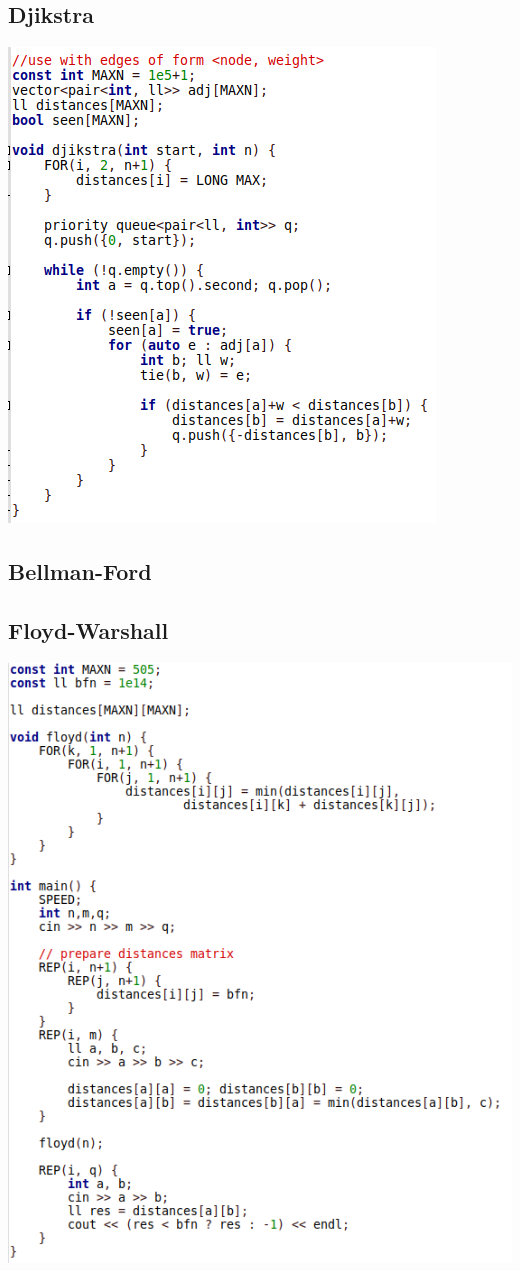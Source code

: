 \documentclass[11pt,twocolumn]{article}
\begin{document}
\subsection{Djikstra}
\includegraphics[scale=0.5]{djikstra}
\subsection{Bellman-Ford}
\subsection{Floyd-Warshall}
\includegraphics[scale=0.4]{floyd}
\end{document}
